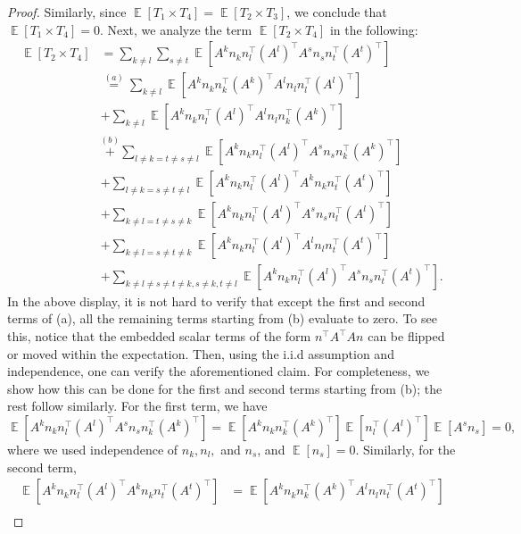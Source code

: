 \documentclass[10pt,a4paper]{amsart}
\DeclareMathOperator{\E}{\mathbb{E}}
\begin{document}
\begin{proof}
    Similarly, since $\E[T_1 \times T_4] = \E[T_2 \times T_3]$, we conclude that $\E[T_1 \times T_4] = 0$. Next, we analyze the term $\E[T_2 \times T_4]$ in the following:
    \begin{align*}
        \E[T_2 \times T_4] & = \sum_{k \neq l} \sum_{s \neq t} \E\left[A^kn_kn_l^{\top}(A^l)^{\top} A^sn_sn_t^{\top}(A^t)^{\top}\right] \\
        & \overset{(a)}{=} \sum_{k\neq l} \E\left[ A^kn_kn_k^{\top}(A^k)^{\top} A^ln_ln_l^{\top}(A^l)^{\top}\right] \\
        & + \sum_{k\neq l} \E\left[ A^kn_kn_l^{\top}(A^l)^{\top} A^ln_ln_k^{\top}(A^k)^{\top}\right] \\
        & \overset{(b)}{+} \sum_{l \neq k = t \neq s \neq l} \E\left[ A^kn_kn_l^{\top}(A^l)^{\top} A^sn_sn_k^{\top}(A^k)^{\top}\right] \\
        & + \sum_{l \neq k = s \neq t \neq l} \E\left[ A^kn_kn_l^{\top}(A^l)^{\top} A^kn_kn_t^{\top}(A^t)^{\top}\right] \\
        & + \sum_{k \neq l = t \neq s \neq k} \E\left[ A^kn_kn_l^{\top}(A^l)^{\top} A^sn_sn_l^{\top}(A^l)^{\top}\right] \\
        & + \sum_{k \neq l = s \neq t \neq k} \E\left[ A^kn_kn_l^{\top}(A^l)^{\top} A^ln_ln_t^{\top}(A^t)^{\top}\right] \\
        & + \sum_{k \neq l \neq s \neq t \neq k, s \neq k, t \neq l} \E\left[ A^kn_kn_l^{\top}(A^l)^{\top} A^sn_sn_t^{\top}(A^t)^{\top}\right].
    \end{align*}
    In the above display, it is not hard to verify that except the first and second terms of (a), all the remaining terms starting from (b) evaluate to zero. To see this, notice that the embedded scalar terms of the form $n^{\top}A^{\top} An$ can be flipped or moved within the expectation. Then, using the i.i.d assumption and independence, one can verify the aforementioned claim. For completeness, we show how this can be done for the first and second terms starting from (b); the rest follow similarly. For the first term, we have
$$ \E\left[ A^kn_k n_l^{\top}(A^l)^{\top} A^sn_sn_k^{\top}(A^k)^{\top}\right] =  \E\left[ A^kn_k n_k^{\top} (A^k)^{\top}\right] \E\left[ n_l^{\top}(A^l)^{\top} \right] \E\left[ A^sn_s  \right] =0,$$
where we used independence of $n_k, n_l,$ and $n_s$, and $\E\left[ n_s \right]=0.$ Similarly, for the second term,  
\begin{align*}
    \E\left[ A^kn_kn_l^{\top}(A^l)^{\top} A^kn_kn_t^{\top}(A^t)^{\top}\right] &= \E\left[ A^kn_k n_k^{\top}(A^k)^{\top} A^l n_l n_t^{\top}(A^t)^{\top}\right] \\

\end{align*}
\end{proof}
\end{document}
